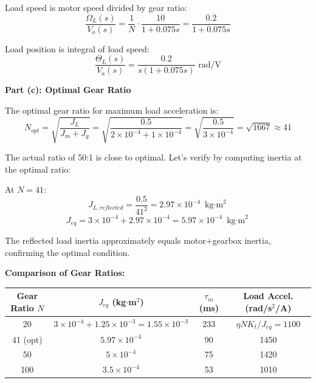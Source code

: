 Load speed is motor speed divided by gear ratio:
\begin{equation}
    \frac{\Omega_L(s)}{V_a(s)} = \frac{1}{N} \cdot \frac{10}{1 + 0.075s} = \frac{0.2}{1 + 0.075s}
\end{equation}

Load position is integral of load speed:
\begin{equation}
    \boxed{\frac{\Theta_L(s)}{V_a(s)} = \frac{0.2}{s(1 + 0.075s)} \text{ rad/V}}
\end{equation}

\textbf{Part (c): Optimal Gear Ratio}

The optimal gear ratio for maximum load acceleration is:
\begin{equation}
    N_{opt} = \sqrt{\frac{J_L}{J_m + J_g}} = \sqrt{\frac{0.5}{2 \times 10^{-4} + 1 \times 10^{-4}}} = \sqrt{\frac{0.5}{3 \times 10^{-4}}} = \sqrt{1667} \approx 41
\end{equation}

The actual ratio of 50:1 is close to optimal. Let's verify by computing inertia at the optimal ratio:

At $N = 41$:
\begin{equation}
    J_{L,reflected} = \frac{0.5}{41^2} = 2.97 \times 10^{-4} \text{ kg$\cdot$m}^2
\end{equation}
\begin{equation}
    J_{eq} = 3 \times 10^{-4} + 2.97 \times 10^{-4} = 5.97 \times 10^{-4} \text{ kg$\cdot$m}^2
\end{equation}

The reflected load inertia approximately equals motor+gearbox inertia, confirming the optimal condition.

\textbf{Comparison of Gear Ratios:}

\begin{center}
\begin{tabular}{cccc}
\toprule
\textbf{Gear Ratio $N$} & \textbf{$J_{eq}$ (kg$\cdot$m$^2$)} & \textbf{$\tau_m$ (ms)} & \textbf{Load Accel. (rad/s$^2$/A)} \\
\midrule
20 & $3 \times 10^{-4} + 1.25 \times 10^{-3} = 1.55 \times 10^{-3}$ & 233 & $\eta N K_t / J_{eq} = 1100$ \\
41 (opt) & $5.97 \times 10^{-4}$ & 90 & 1450 \\
50 & $5 \times 10^{-4}$ & 75 & 1420 \\
100 & $3.5 \times 10^{-4}$ & 53 & 1010 \\
\bottomrule
\end{tabular}
\end{center}

